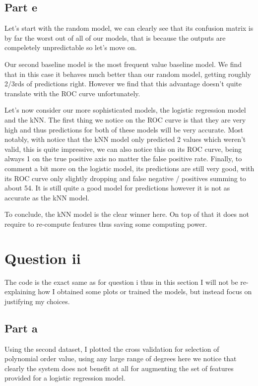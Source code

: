 \documentclass[10pt]{article}
\begin{document}
\subsection*{Part e}
Let's start with the random model, we can clearly see that its confusion matrix is by far
the worst out of all of our models, that is because the outputs are compeletely unpredictable so let's move on.
\par
Our second baseline model is the most frequent value baseline model. We find that in this case it behaves
much better than our random model, getting roughly 2/3rds of predictions right. However we find that this advantage
doesn't quite translate with the ROC curve unfortunately.
\par
Let's now consider our more sophisticated models, the logistic regression model and the kNN.
The first thing we notice on the ROC curve is that they are very high and thus predictions for both of these models
will be very accurate.
Most notably, with notice that the kNN model only predicted 2 values which weren't valid, this is quite impressive, we
can also notice this on its ROC curve, being always 1 on the true positive axis no matter the false positive rate.
Finally, to comment a bit more on the logistic model, its predictions are still very good, with its ROC curve only slightly
dropping and false negative / positives summing to about 54. It is still quite a good model for predictions however it is not
as accurate as the kNN model.
\par
To conclude, the kNN model is the clear winner here. On top of that it does not require to re-compute features thus saving
some computing power.


\section*{Question ii}
The code is the exact same as for question i thus in this section I will not be re-explaining
how I obtained some plots or trained the models, but instead focus on justifying my choices.
\subsection*{Part a}
Using the second dataset, I plotted the cross validation for selection of
polynomial order value, using any large range of degrees here we notice that clearly the system does not
benefit at all for augmenting the set of features provided for a logistic regression model.
\end{document}
